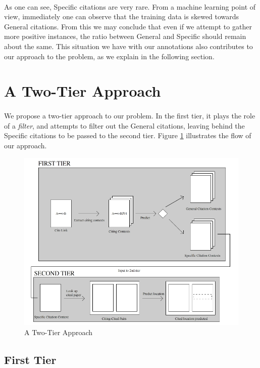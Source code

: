 \paragraph{}
As one can see, Specific citations are very rare. From a machine learning point of view, immediately one can observe that the training data is skewed towards General citations. From this we may conclude that even if we attempt to gather more positive instances, the ratio between General and Specific should remain about the same. This situation we have with our annotations also contributes to our approach to the problem, as we explain in the following section.

\section{A Two-Tier Approach}
\paragraph{}
We propose a two-tier approach to our problem. In the first tier, it plays the role of a \textit{filter}, and attempts to filter out the General citations, leaving behind the Specific citations to be passed to the second tier. Figure \ref{fig:twotier} illustrates the flow of our approach.
\begin{figure}[h]
  \centering
  \includegraphics[scale=0.60]{./twotier}
  \caption{A Two-Tier Approach}
  \label{fig:twotier}
\end{figure}

\subsection{First Tier}
